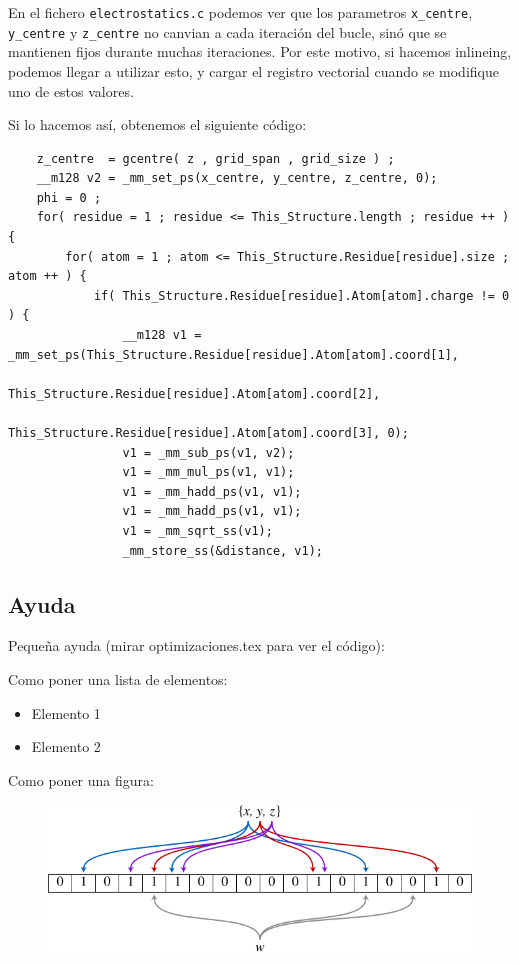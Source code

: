 En el fichero \texttt{electrostatics.c} podemos ver que los parametros
\texttt{x\_centre}, \texttt{y\_centre} y \texttt{z\_centre} no canvian a cada
iteraci\'{o}n del bucle, sin\'{o} que se mantienen fijos durante muchas
iteraciones. Por este motivo, si hacemos inlineing, podemos llegar a
utilizar esto, y cargar el registro vectorial cuando se modifique uno de
estos valores.

Si lo hacemos as\'{i}, obtenemos el siguiente c\'{odigo}:

\begin{lstlisting}
	z_centre  = gcentre( z , grid_span , grid_size ) ;
	__m128 v2 = _mm_set_ps(x_centre, y_centre, z_centre, 0);
	phi = 0 ;
	for( residue = 1 ; residue <= This_Structure.length ; residue ++ ) {
		for( atom = 1 ; atom <= This_Structure.Residue[residue].size ; atom ++ ) {
			if( This_Structure.Residue[residue].Atom[atom].charge != 0 ) {
				__m128 v1 = _mm_set_ps(This_Structure.Residue[residue].Atom[atom].coord[1],
						This_Structure.Residue[residue].Atom[atom].coord[2],
						This_Structure.Residue[residue].Atom[atom].coord[3], 0);
				v1 = _mm_sub_ps(v1, v2);
				v1 = _mm_mul_ps(v1, v1);
				v1 = _mm_hadd_ps(v1, v1);
				v1 = _mm_hadd_ps(v1, v1);
				v1 = _mm_sqrt_ss(v1);	
				_mm_store_ss(&distance, v1);
\end{lstlisting}


\subsection{Ayuda}

Peque\~{n}a ayuda (mirar optimizaciones.tex para ver el c\'{o}digo):

Como poner una lista de elementos:
\begin{itemize}
   \item Elemento 1
   \item Elemento 2
\end{itemize}

Como poner una figura:
\begin{figure}[ht]
   \centering
   \includegraphics[keepaspectratio=true,width=.6\textwidth]{figures/muestra}
\end{figure}

